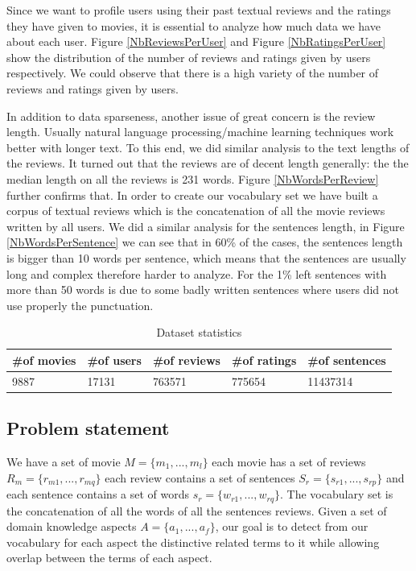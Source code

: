 \documentclass{article}
\begin{document}
Since we want to profile users using their past textual reviews and the ratings they have given to movies, it is essential to analyze how much data we have about each user. Figure \ref{NbReviewsPerUser} and Figure \ref{NbRatingsPerUser} show the distribution of the number of reviews and ratings given by users respectively. We could observe that there is a high variety of the number of reviews and ratings given by users. 

In addition to data sparseness, another issue of great concern is the review length. Usually natural language processing/machine learning techniques work better with longer text. To this end, we did similar analysis to the text lengths of the reviews. It turned out that the reviews are of decent length generally: the the median length on all the reviews is 231 words. Figure \ref{NbWordsPerReview} further confirms that. In order to create our vocabulary set we have built a corpus of textual reviews which is the concatenation of all the movie reviews written by all users.
We did a similar analysis for the sentences length, in Figure \ref{NbWordsPerSentence} we can see that in 60\% of the cases, the sentences length  is bigger than 10 words per sentence, which means that the sentences are usually long and complex therefore harder to analyze. For the 1\% left  sentences with more than 50 words is due to some badly written sentences where users did not use properly the punctuation. 

\begin{table}[]
\centering
\caption{Dataset statistics}
\label{datastat}
\begin{tabular}{|l|l|l|l|l|}
\hline
\#of movies & \#of users & \#of reviews & \#of ratings & \#of sentences \\ \hline
9887        & 17131      & 763571       & 775654       & 11437314       \\ \hline
\end{tabular}
\end{table}
\subsection{Problem statement}
We have a set of movie $M = \{m_{1},...,m_{l}\}$ each movie has a set of reviews  $R_{m} = \{r_{m1},..., r_{mq} \}$ each review contains a set of sentences $S_{r} = \{s_{r1},..., s_{rp} \}$ and each sentence contains a set of words $s_{r} = \{w_{r1},..., w_{rq} \}$.
The vocabulary set is the concatenation of all the words of all the sentences reviews.
Given a set of domain knowledge aspects $A = \{a_{1},..., a_{f} \}$, our goal is to detect from our vocabulary for each aspect the distinctive related terms to it while allowing overlap between the terms of each aspect.
\end{document}
